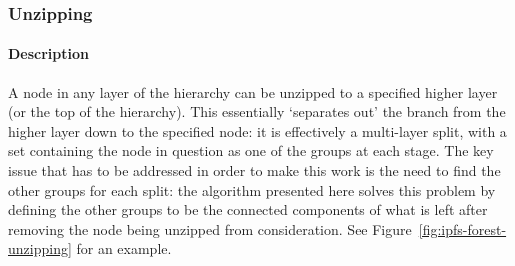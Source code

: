 \newpage

\subsubsection{Unzipping}

\paragraph{Description}

A node in any layer of the hierarchy can be unzipped to a specified higher layer (or the top of the hierarchy). This essentially `separates out' the branch from the higher layer down to the specified node: it is effectively a multi-layer split, with a set containing the node in question as one of the groups at each stage. The key issue that has to be addressed in order to make this work is the need to find the other groups for each split: the algorithm presented here solves this problem by defining the other groups to be the connected components of what is left after removing the node being unzipped from consideration. See Figure~\ref{fig:ipfs-forest-unzipping} for an example.

